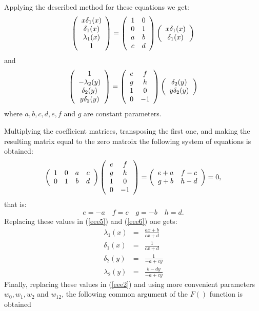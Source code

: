 Applying the described method for these equations we get:
\begin{equation}\label{eee4}
\left(\begin{array}{c} x\delta_1(x) \cr \delta_1(x) \cr \lambda_1(x) \cr 1\end{array}\right) = \left(\begin{array}{cc} 1 & 0 \cr  0 & 1 \cr  a & b \cr  c & d \cr \end{array}\right)\left(\begin{array}{c} x\delta_1(x) \cr \delta_1(x)\end{array}\right)
\end{equation}
and
\begin{equation}\label{eee5}
\left(\begin{array}{c} 1 \cr -\lambda_2(y) \cr \delta_2(y) \cr y \delta_2(y) \cr \end{array}\right) = \left(\begin{array}{cc} e & f \cr  g & h \cr  1 & 0 \cr  0 & -1 \cr \end{array}\right)\left(\begin{array}{c} \delta_2(y) \cr y \delta_2(y) \cr\end{array}\right)
\end{equation}
where $a, b, c, d, e, f$ and $g$ are constant parameters.

Multiplying the coefficient matrices, transposing the first one, and making the resulting matrix equal to the zero matroix the following system of equations is obtained:
\begin{equation}\label{eee6}
\left(\begin{array}{cccc} 1 & 0 & a & c\cr 0 & 1 & b & d \cr \end{array}\right) \left(\begin{array}{cc} e & f \cr  g & h \cr  1 & 0 \cr  0 & -1 \cr \end{array}\right) = \left(\begin{array}{cc} e + a & f-c\cr g+b & h-d \cr \end{array}\right) = 0,
\end{equation}
that is:
\begin{equation}\label{eee7}
e = -a\quad f = c\quad g = -b\quad h = d.
\end{equation}
Replacing these values in (\ref{eee5}) and (\ref{eee6}) one gets:
\begin{eqnarray}
\lambda_1(x) & = & \frac{a x + b}{cx+ d}\\
\delta_1(x ) & = & \frac{1}{cx+ d}\\
\delta_2(y) & = & \frac{1}{-a+ cy}\\
\lambda_2(y) & = & \frac{b- d y}{-a+ cy}
\end{eqnarray}
Finally, replacing these values in (\ref{eee2}) and using more convenient parameters $w_0, w_1, w_2$ and $w_{12}$, the following common argument of the $F()$ function is obtained

